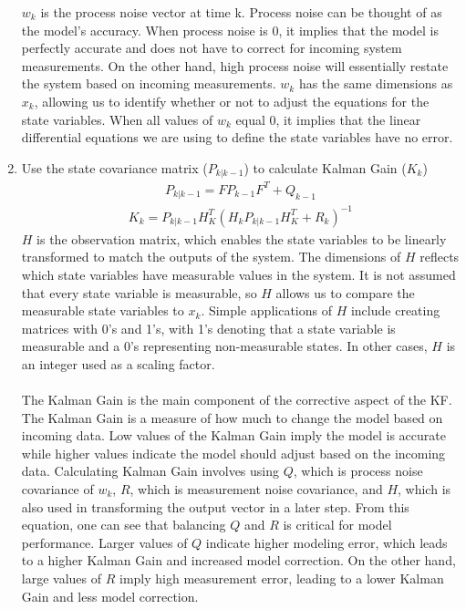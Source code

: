 \begin{enumerate}
  $w_k$ is the process noise vector at time k. Process noise can be thought of as the model's accuracy. When process noise is 0, it implies that the model is perfectly accurate and does not have to correct for incoming system measurements. On the other hand, high process noise will essentially restate the system based on incoming measurements. $w_k$ has the same dimensions as $x_k$, allowing us to identify whether or not to adjust the equations for the state variables. When all values of  $w_k$ equal 0, it implies that the linear differential equations we are using to define the state variables have no error. 
  \item Use the state covariance matrix ($P_{k | k - 1}$) to calculate Kalman Gain ($K_k$) 
    \begin{align*} 
        P_{k | k -1} = F P_{k - 1} F^T + Q_{k-1} 
    \end{align*}
    \begin{align*} 
        K_k = P_{k | k - 1} H^T_K (H_k P_{k | k - 1} H^T_K + R_k)^{-1}
    \end{align*}
      $H$ is the observation matrix, which enables the state variables to be linearly transformed to match the outputs of the system. The dimensions of $H$ reflects which state variables have measurable values in the system. It is not assumed that every state variable is measurable, so $H$ allows us to compare the measurable state variables to $x_k$. Simple applications of $H$ include creating matrices with 0's and 1's, with 1's denoting that a state variable is measurable and a 0's representing non-measurable states. In other cases, $H$ is an integer used as a scaling factor. \\ \\
     The Kalman Gain is the main component of the corrective aspect of the KF. The Kalman Gain is a measure of how much to change the model based on incoming data. Low values of the Kalman Gain imply the model is accurate while higher values indicate the model should adjust based on the incoming data. Calculating Kalman Gain involves using $Q$, which is process noise covariance of $w_k$,   $R$, which is measurement noise covariance, and $H$, which is also used in transforming the output vector in a later step. 
     From this equation, one can see that balancing $Q$ and $R$ is critical for model performance. Larger values of $Q$ indicate higher modeling error, which leads to a higher Kalman Gain and increased model correction. On the other hand, large values of $R$ imply high measurement error, leading to a lower Kalman Gain and less model correction. 

\end{enumerate}
